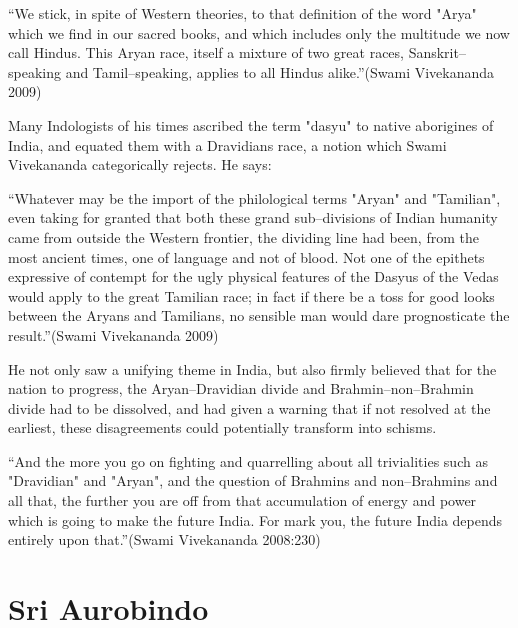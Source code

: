 \begin{myquote}
“We stick, in spite of Western theories, to that definition of the word "Arya" which we find in our sacred books, and which includes only the multitude we now call Hindus. This Aryan race, itself a mixture of two great races, Sanskrit–speaking and Tamil–speaking, applies to all Hindus alike.”(Swami Vivekananda 2009)
\end{myquote}

Many Indologists of his times ascribed the term "dasyu" to native aborigines of India, and equated them with a Dravidians race, a notion which Swami Vivekananda categorically rejects. He says:

\begin{myquote}
“Whatever may be the import of the philological terms "Aryan" and "Tamilian", even taking for granted that both these grand sub–divisions of Indian humanity came from outside the Western frontier, the dividing line had been, from the most ancient times, one of language and not of blood. Not one of the epithets expressive of contempt for the ugly physical features of the Dasyus of the Vedas would apply to the great Tamilian race; in fact if there be a toss for good looks between the Aryans and Tamilians, no sensible man would dare prognosticate the result.”(Swami Vivekananda 2009)
\end{myquote}

He not only saw a unifying theme in India, but also firmly believed that for the nation to progress, the Aryan–Dravidian divide and Brahmin–non–Brahmin divide had to be dissolved, and had given a warning that if not resolved at the earliest, these disagreements could potentially transform into schisms.

\begin{myquote}
“And the more you go on fighting and quarrelling about all trivialities such as "Dravidian" and "Aryan", and the question of Brahmins and non–Brahmins and all that, the further you are off from that accumulation of energy and power which is going to make the future India. For mark you, the future India depends entirely upon that.”(Swami Vivekananda 2008:230)
\end{myquote}


\section*{Sri Aurobindo}


